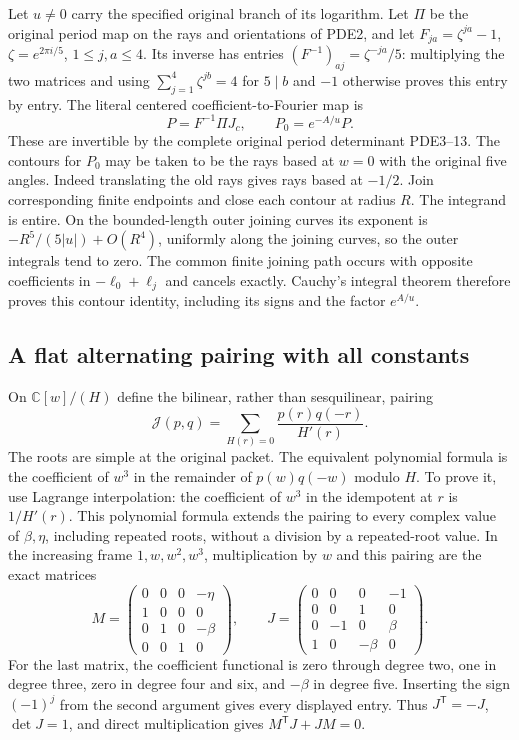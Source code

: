 Let $u\ne0$ carry the specified original branch of its logarithm.
Let $\Pi$ be the original period map on the rays and orientations
of PDE2, and let $F_{ja}=\zeta^{ja}-1$, $\zeta=e^{2\pi i/5}$,
$1\leq j,a\leq4$. Its inverse has entries
$(F^{-1})_{aj}=\zeta^{-ja}/5$: multiplying the two matrices and using
$\sum_{j=1}^4\zeta^{jb}=4$ for $5\mid b$ and $-1$ otherwise proves
this entry by entry. The literal centered coefficient-to-Fourier map is
\[
 P=F^{-1}\Pi J_c,\qquad P_0=e^{-A/u}P.
 \tag{RPC3}
\]
These are invertible by the complete original period determinant
PDE3--13. The contours for $P_0$ may be taken to be the rays based at
$w=0$ with the original five angles. Indeed translating the old rays
gives rays based at $-1/2$. Join corresponding finite endpoints and
close each contour at radius $R$. The integrand is entire. On the
bounded-length outer joining curves its exponent is
$-R^5/(5|u|)+O(R^4)$, uniformly along the joining curves, so the
outer integrals tend to zero. The common finite joining path occurs
with opposite coefficients in $-\ell_0+\ell_j$ and cancels exactly.
Cauchy's integral theorem therefore proves this contour identity,
including its signs and the factor $e^{A/u}$.

\subsection{A flat alternating pairing with all constants}

On $\mathbb C[w]/(H)$ define the bilinear, rather than sesquilinear,
pairing
\[
 \mathcal J(p,q)=\sum_{H(r)=0}\frac{p(r)q(-r)}{H'(r)}.
 \tag{RPC4}
\]
The roots are simple at the original packet. The equivalent polynomial
formula is the coefficient of $w^3$ in the remainder of $p(w)q(-w)$
modulo $H$. To prove it, use Lagrange interpolation: the coefficient
of $w^3$ in the idempotent at $r$ is $1/H'(r)$. This polynomial
formula extends the pairing to every complex value of $\beta,\eta$,
including repeated roots, without a division by a repeated-root value.
In the increasing frame $1,w,w^2,w^3$, multiplication by $w$ and
this pairing are the exact matrices
\[
 M=\begin{pmatrix}0&0&0&-\eta\\1&0&0&0\\0&1&0&-\beta\\0&0&1&0\end{pmatrix},
 \qquad
 J=\begin{pmatrix}0&0&0&-1\\0&0&1&0\\0&-1&0&\beta\\1&0&-\beta&0\end{pmatrix}.
 \tag{RPC5}
\]
For the last matrix, the coefficient functional is zero through degree
two, one in degree three, zero in degree four and six, and $-\beta$
in degree five. Inserting the sign $(-1)^j$ from the second argument
gives every displayed entry. Thus $J^{\mathsf T}=-J$, $\det J=1$,
and direct multiplication gives $M^{\mathsf T}J+JM=0$.

